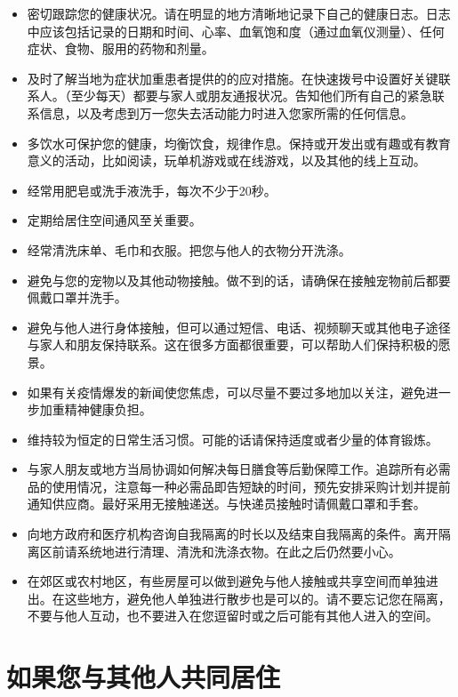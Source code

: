 \documentclass[onecolumn,journal]{IEEEtran}
\begin{document}
\begin{multicols}{2}
\begin{itemize}
  \item 密切跟踪您的健康状况。请在明显的地方清晰地记录下自己的健康日志。日志中应该包括记录的日期和时间、心率、血氧饱和度（通过血氧仪测量）、任何症状、食物、服用的药物和剂量。
  \item 及时了解当地为症状加重患者提供的的应对措施。在快速拨号中设置好关键联系人。（至少每天）都要与家人或朋友通报状况。告知他们所有自己的紧急联系信息，以及考虑到万一您失去活动能力时进入您家所需的任何信息。
  \item 多饮水可保护您的健康，均衡饮食，规律作息。保持或开发出或有趣或有教育意义的活动，比如阅读，玩单机游戏或在线游戏，以及其他的线上互动。
  \item 经常用肥皂或洗手液洗手，每次不少于20秒。
  \item 定期给居住空间通风至关重要。
  \item 经常清洗床单、毛巾和衣服。把您与他人的衣物分开洗涤。
  \item 避免与您的宠物以及其他动物接触。做不到的话，请确保在接触宠物前后都要佩戴口罩并洗手。
  \item 避免与他人进行身体接触，但可以通过短信、电话、视频聊天或其他电子途径与家人和朋友保持联系。这在很多方面都很重要，可以帮助人们保持积极的愿景。
  \item 如果有关疫情爆发的新闻使您焦虑，可以尽量不要过多地加以关注，避免进一步加重精神健康负担。
  \item 维持较为恒定的日常生活习惯。可能的话请保持适度或者少量的体育锻炼。
  \item 与家人朋友或地方当局协调如何解决每日膳食等后勤保障工作。追踪所有必需品的使用情况，注意每一种必需品即告短缺的时间，预先安排采购计划并提前通知供应商。最好采用无接触递送。与快递员接触时请佩戴口罩和手套。
  \item 向地方政府和医疗机构咨询自我隔离的时长以及结束自我隔离的条件。离开隔离区前请系统地进行清理、清洗和洗涤衣物。在此之后仍然要小心。
  \item 在郊区或农村地区，有些房屋可以做到避免与他人接触或共享空间而单独进出。在这些地方，避免他人单独进行散步也是可以的。请不要忘记您在隔离，不要与他人互动，也不要进入在您逗留时或之后可能有其他人进入的空间。

\end{itemize}

\section*{如果您与其他人共同居住}

\begin{itemize}


\end{itemize}
\end{multicols}
\end{document}
